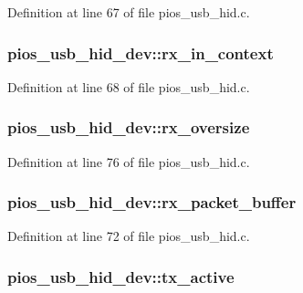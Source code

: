 Definition at line 67 of file pios\-\_\-usb\-\_\-hid.\-c.

\hypertarget{group___p_i_o_s___u_s_b___h_i_d_ga2ce875c5efa2b6b450f143818872513a}{
\subsubsection[{rx\-\_\-in\-\_\-context}]{ pios\-\_\-usb\-\_\-hid\-\_\-dev\-::rx\-\_\-in\-\_\-context}}\label{group___p_i_o_s___u_s_b___h_i_d_ga2ce875c5efa2b6b450f143818872513a}


Definition at line 68 of file pios\-\_\-usb\-\_\-hid.\-c.

\hypertarget{group___p_i_o_s___u_s_b___h_i_d_gaddc9bf1640b3a06aff88c4adaa6d3601}{
\subsubsection[{rx\-\_\-oversize}]{ pios\-\_\-usb\-\_\-hid\-\_\-dev\-::rx\-\_\-oversize}}\label{group___p_i_o_s___u_s_b___h_i_d_gaddc9bf1640b3a06aff88c4adaa6d3601}


Definition at line 76 of file pios\-\_\-usb\-\_\-hid.\-c.

\hypertarget{group___p_i_o_s___u_s_b___h_i_d_ga20fb92cd6b239abc72cb0ac8b93b11b4}{
\subsubsection[{rx\-\_\-packet\-\_\-buffer}]{ pios\-\_\-usb\-\_\-hid\-\_\-dev\-::rx\-\_\-packet\-\_\-buffer}}\label{group___p_i_o_s___u_s_b___h_i_d_ga20fb92cd6b239abc72cb0ac8b93b11b4}


Definition at line 72 of file pios\-\_\-usb\-\_\-hid.\-c.

\hypertarget{group___p_i_o_s___u_s_b___h_i_d_ga3c0deaac64c0f63bdb4a5cd41379bc23}{
\subsubsection[{tx\-\_\-active}]{ pios\-\_\-usb\-\_\-hid\-\_\-dev\-::tx\-\_\-active}}\label{group___p_i_o_s___u_s_b___h_i_d_ga3c0deaac64c0f63bdb4a5cd41379bc23}


